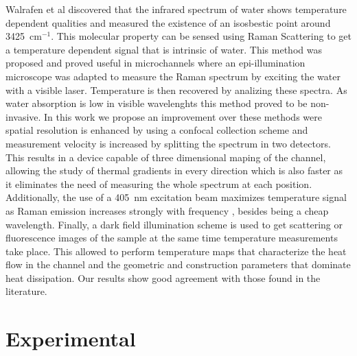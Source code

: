 \documentclass[twocolumn]{svjour3}       %
\begin{document}
Walrafen et al \cite{walrafen1} discovered that the infrared spectrum of water shows temperature dependent qualities and measured the existence of an isosbestic point around 3425~$\mathrm{cm^{-1}}$. This molecular property can be sensed using Raman Scattering to get a temperature dependent signal that is intrinsic of water. This method was proposed and proved useful in microchannels \cite{raman1,raman2,raman3} where an epi-illumination microscope was adapted to measure the Raman spectrum by exciting the water with a visible laser. Temperature is then recovered by analizing these spectra. As water absorption is low in visible wavelenghts \cite{absorption} this method proved to be non-invasive. In this work we propose an improvement over these methods were spatial resolution is enhanced by using a confocal collection scheme and measurement velocity is increased by splitting the spectrum in two detectors. This results in a device capable of three dimensional maping of the channel, allowing the study of thermal gradients in every direction which is also faster as it eliminates the need of measuring the whole spectrum at each position. Additionally, the use of a 405~nm excitation beam maximizes temperature signal as Raman emission increases strongly with frequency \cite{faris}, besides being a cheap wavelength. Finally, a dark field illumination scheme is used to get scattering or fluorescence images of the sample at the same time temperature measurements take place. This allowed to perform temperature maps that characterize the heat flow in the channel and the geometric and construction parameters that dominate heat dissipation. Our results show good agreement with those found in the literature. 

\section{Experimental}
\end{document}
